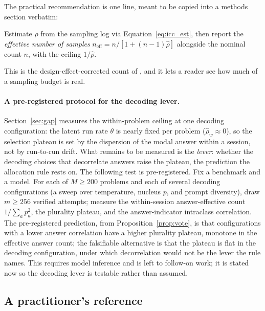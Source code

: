 \documentclass[11pt]{article}
\newcommand{\neff}{n_{\mathrm{eff}}}
\begin{document}
The practical recommendation is one line, meant to be copied into a methods section verbatim:
\begin{takeaway}
Estimate $\hat\rho$ from the sampling log via Equation~\eqref{eq:icc_est}, then report the \emph{effective number of samples} $\neff = n/[1+(n-1)\hat\rho]$ alongside the nominal count $n$, with the ceiling $1/\hat\rho$.
\end{takeaway}
This is the design-effect-corrected count of \citet{kish1965survey}, and it lets a reader see how much of a sampling budget is real.

\paragraph{A pre-registered protocol for the decoding lever.}
Section~\ref{sec:gap} measures the within-problem ceiling at one decoding configuration: the latent run rate $\theta$ is nearly fixed per problem ($\hat\rho_w\approx0$), so the selection plateau is set by the dispersion of the modal answer within a session, not by run-to-run drift. What remains to be measured is the \emph{lever}: whether the decoding choices that decorrelate answers raise the plateau, the prediction the allocation rule rests on. The following test is pre-registered. Fix a benchmark and a model. For each of $M\ge200$ problems and each of several decoding configurations (a sweep over temperature, nucleus $p$, and prompt diversity), draw $m\ge256$ verified attempts; measure the within-session answer-effective count $1/\sum_a p_a^2$, the plurality plateau, and the answer-indicator intraclass correlation. The pre-registered prediction, from Proposition~\ref{prop:vote}, is that configurations with a lower answer correlation have a higher plurality plateau, monotone in the effective answer count; the falsifiable alternative is that the plateau is flat in the decoding configuration, under which decorrelation would not be the lever the rule names. This requires model inference and is left to follow-on work; it is stated now so the decoding lever is testable rather than assumed.

\subsection{A practitioner's reference}
\label{sec:summary}
\end{document}
